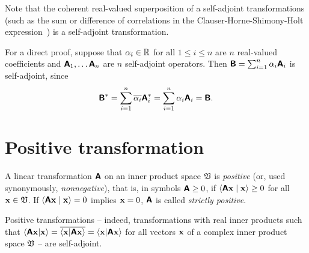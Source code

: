 Note that the coherent real-valued superposition
of a self-adjoint transformations
(such as the sum or difference of correlations in
the Clauser-Horne-Shimony-Holt expression~\cite{filipp-svo-04-qpoly-prl})
is a self-adjoint transformation.

{\color{OliveGreen}\bproof
For a direct proof,
suppose that $\alpha_i \in {\Bbb R}$ for all $1\le i \le n$ are $n$ real-valued coefficients and
$\textsf{\textbf{A}}_1, \ldots \textsf{\textbf{A}}_n$ are $n$ self-adjoint operators.
Then
$\textsf{\textbf{B}} = \sum_{i=1}^n \alpha_i \textsf{\textbf{A}}_i$
is self-adjoint, since
\begin{equation}
\textsf{\textbf{B}}^\ast  = \sum_{i=1}^n \overline{\alpha_i} \textsf{\textbf{A}}_i^\ast  = \sum_{i=1}^n  \alpha_i  \textsf{\textbf{A}}_i
=\textsf{\textbf{B}}
.
\end{equation}
\eproof
}

\section{Positive transformation}
\label{2015-m-ch-fdlvs-positive}

A linear transformation  $\textsf{\textbf{A}}$ on an inner product space ${\frak V}$ is {\em positive} (or, used synonymously, {\em nonnegative}),
that is, in symbols $\textsf{\textbf{A}}\ge 0$,
if $\langle \textsf{\textbf{A}}{\bf x}\mid {\bf x}\rangle  \ge 0$ for all ${\bf x}\in {\frak V}$.
If  $\langle \textsf{\textbf{A}}{\bf x}\mid {\bf x}\rangle = 0$ implies
${\bf x}=0$, $\textsf{\textbf{A}}$ is called {\em strictly positive}.


Positive transformations -- indeed, transformations with real inner products such that
$
\langle \textsf{\textbf{A}} {\bf x}\vert {\bf x}\rangle
= \overline{\langle {\bf x}\vert \textsf{\textbf{A}}{\bf x}\rangle }
=
\langle {\bf x}\vert \textsf{\textbf{A}}{\bf x}\rangle$
for all vectors  ${\bf x}$
of a complex inner product space ${\frak V}$ --
are self-adjoint.

